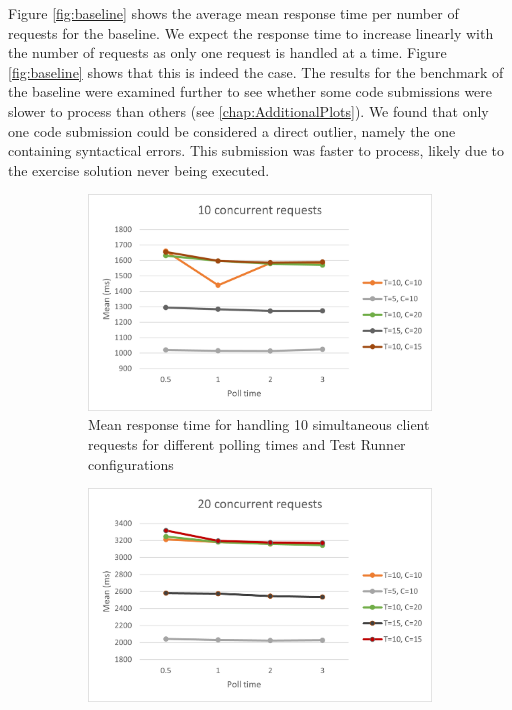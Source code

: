Figure \ref{fig:baseline} shows the average mean response time per number of requests for the baseline.
We expect the response time to increase linearly with the number of requests as only one request is handled at a time.
Figure \ref{fig:baseline} shows that this is indeed the case.
The results for the benchmark of the baseline were examined further to see whether some code submissions were slower to process than others (see \ref{chap:AdditionalPlots}).
We found that only one code submission could be considered a direct outlier, namely the one containing syntactical errors.
This submission was faster to process, likely due to the exercise solution never being executed.



\begin{figure}[H]
  \centering
  \begin{subfigure}[b]{0.45\textwidth}
      \centering
      \includegraphics[width=\textwidth]{images/10.png}
      \caption{Mean response time for handling 10 simultaneous client requests for different polling times and Test Runner configurations}
      \label{fig:resultstart}
  \end{subfigure}
  \hfill
  \begin{subfigure}[b]{0.45\textwidth}
    \centering
    \includegraphics[width=\textwidth]{images/20.png}

\end{subfigure}
\end{figure}
